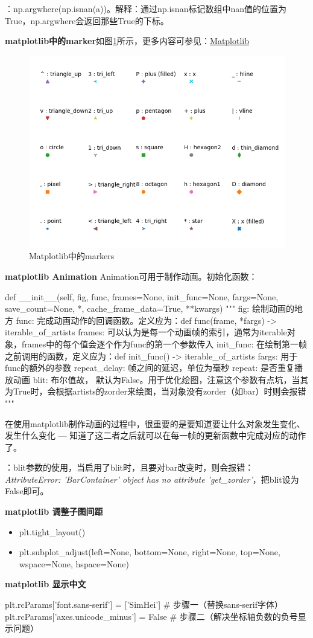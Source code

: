 ：np.argwhere(np.isnan(a))。解释：通过np.isnan标记数组中nan值的位置为True，np.argwhere会返回那些True的下标。


\textbf{matplotlib中的marker}如图\ref{fig:matplotlib-markers}所示，更多内容可参见：\href{https://matplotlib.org/api/_as_gen/matplotlib.pyplot.plot.html#matplotlib.pyplot.plot}{Matplotlib}
\begin{figure}[h]
	\centering
	\includegraphics[width=.65\textwidth]{pics/markers.png}
	\caption{Matplotlib中的markers}
	\label{fig:matplotlib-markers}
\end{figure}

\textbf{matplotlib Animation}
Animation可用于制作动画。初始化函数：
\begin{python}
	def __init__(self, fig, func, frames=None, init_func=None, fargs=None,
	save_count=None, *, cache_frame_data=True, **kwargs)
	"""
	fig: 绘制动画的地方
	func: 完成动画动作的回调函数。定义应为：def func(frame, *fargs) -> iterable_of_artists
	frames: 可以认为是每一个动画帧的索引，通常为iterable对象，frames中的每个值会逐个作为func的第一个参数传入
	init_func: 在绘制第一帧之前调用的函数，定义应为：def init_func() -> iterable_of_artists
	fargs: 用于func的额外的参数
	repeat_delay: 帧之间的延迟，单位为毫秒
	repeat: 是否重复播放动画
	blit: 布尔值故， 默认为False。用于优化绘图，注意这个参数有点坑，当其为True时，会根据artists的zorder来绘图，当对象没有zorder（如bar）时则会报错
	"""
\end{python}
在使用matplotlib制作动画的过程中，很重要的是要知道要让什么对象发生变化、发生什么变化 --- 知道了这二者之后就可以在每一帧的更新函数中完成对应的动作了。

：blit参数的使用，当启用了blit时，且要对bar改变时，则会报错：\textit{AttributeError: 'BarContainer' object has no attribute 'get\_zorder'}，把blit设为False即可。


\textbf{matplotlib 调整子图间距}
\begin{itemize}
	\item plt.tight\_layout()
	\item plt.subplot\_adjust(left=None, bottom=None, right=None, top=None, wspace=None, hspace=None)
\end{itemize}

\textbf{matplotlib 显示中文}
\begin{python}
	plt.rcParams['font.sans-serif'] = ['SimHei'] # 步骤一（替换sans-serif字体）  
	plt.rcParams['axes.unicode_minus'] = False  # 步骤二（解决坐标轴负数的负号显示问题）
\end{python}






